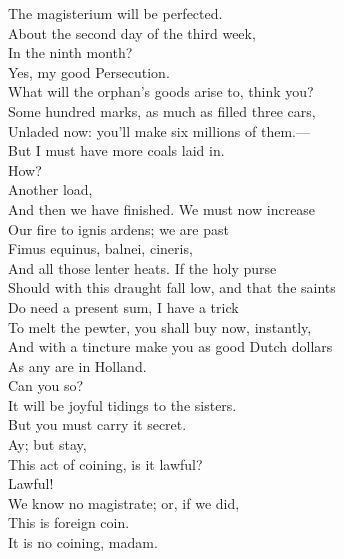 \documentclass[a4paper,oneside,12pt]{memoir}
\begin{document}
\begin{drama*}
The magisterium will be perfected.\\
\persecutionspeaks About the second day of the third week,\\
In the ninth month?\\
\subtlespeaks {} Yes, my good Persecution.\\
\tribulationspeaks What will the orphan's goods arise to, think you?\\
\subtlespeaks Some hundred marks, as much as filled three cars,\\
Unladed now: you'll make six millions of them.---\\
But I must have more coals laid in.\\
\tribulationspeaks {} How?\\
\subtlespeaks {} Another load,\\
And then we have finished. We must now increase\\
Our fire to ignis ardens; we are past\\
Fimus equinus, balnei, cineris,\\
And all those lenter heats. If the holy purse\\
Should with this draught fall low, and that the saints\\
Do need a present sum, I have a trick\\
To melt the pewter, you shall buy now, instantly,\\
And with a tincture make you as good Dutch dollars\\
As any are in Holland.\\
\tribulationspeaks {} Can you so?\\
\persecutionspeaks It will be joyful tidings to the sisters.\\
\subtlespeaks But you must carry it secret.\\
\tribulationspeaks {} Ay; but stay,\\
This act of coining, is it lawful?\\
\persecutionspeaks {} Lawful!\\
We know no magistrate; or, if we did,\\
This is foreign coin.\\
\subtlespeaks {} It is no coining, madam.\\

\end{drama*}
\end{document}
